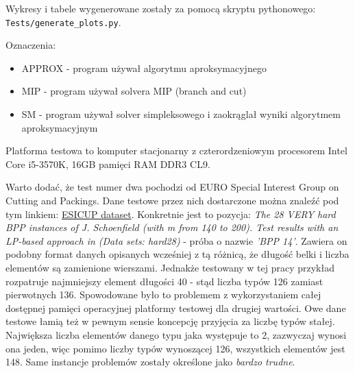 Wykresy i tabele wygenerowane zostały za pomocą skryptu pythonowego: \\ \verb|Tests/generate_plots.py|.

Oznaczenia:
\begin{itemize}
	\item APPROX - program używał algorytmu aproksymacyjnego
	\item MIP - program używał solvera MIP (branch and cut)
	\item SM - program używał solver simpleksowego i zaokrąglał wyniki algorytmem aproksymacyjnym
\end{itemize}

Platforma testowa to komputer stacjonarny z czterordzeniowym procesorem Intel Core i5-3570K, 16GB pamięci RAM DDR3 CL9.

Warto dodać, że test numer dwa pochodzi od EURO Special Interest Group on Cutting and Packings. Dane testowe przez nich dostarczone można znaleźć pod tym linkiem:
\href{https://www.euro-online.org/websites/esicup/data-sets/}{ESICUP dataset}.
Konkretnie jest to pozycja: \textit{The 28 VERY hard BPP instances of J. Schoenfield (with m from 140 to 200). Test results with an LP-based approach in (Data sets: hard28)} - próba o nazwie \textit{'BPP    14'}. Zawiera on podobny format danych opisanych wcześniej z tą różnicą, że długość belki i liczba elementów są zamienione wierszami. Jednakże testowany w tej pracy przykład rozpatruje najmniejszy element długości 40 - stąd liczba typów 126 zamiast pierwotnych 136. Spowodowane było to problemem z wykorzystaniem całej dostępnej pamięci operacyjnej platformy testowej dla drugiej wartości. Owe dane testowe łamią też w pewnym sensie koncepcję przyjęcia za liczbę typów stałej. Największa liczba elementów danego typu jaka występuje to 2, zazwyczaj wynosi ona jeden, więc pomimo liczby typów wynoszącej 126, wszystkich elementów jest 148. Same instancje problemów zostały określone jako \textit{bardzo trudne}.

